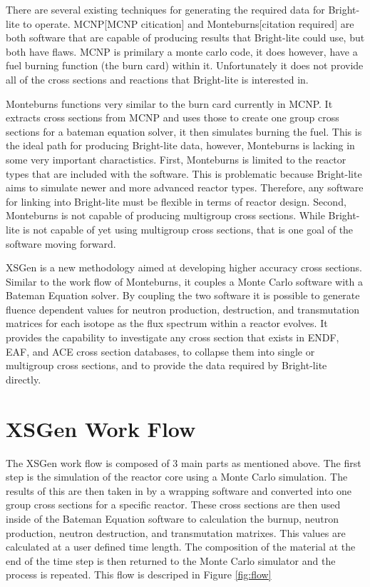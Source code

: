 \documentclass{article}
\begin{document}
There are several existing techniques for generating the required data for Bright-lite to operate. MCNP[MCNP citication] and Monteburns[citation required] are both software that are capable of producing results that Bright-lite could use, but both have flaws. MCNP is primilary a monte carlo code, it does however, have a fuel burning function (the burn card) within it. Unfortunately it does not provide all of the cross sections and reactions that Bright-lite is interested in. 

Monteburns functions very similar to the burn card currently in MCNP. It extracts cross sections from MCNP and uses those to create one group cross sections for a bateman equation solver, it then simulates burning the fuel. This is the ideal path for producing Bright-lite data, however, Monteburns is lacking in some very important charactistics. First, Monteburns is limited to the reactor types that are included with the software. This is problematic because Bright-lite aims to simulate newer and more advanced reactor types. Therefore, any software for linking into Bright-lite must be flexible in terms of reactor design. Second, Monteburns is not capable of producing multigroup cross sections. While Bright-lite is not capable of yet using multigroup cross sections, that is one goal of the software moving forward.   

XSGen is a new methodology aimed at developing higher accuracy cross sections. Similar to the work flow of Monteburns, it couples a Monte Carlo software with a Bateman Equation solver.  By coupling the two software it is possible to generate fluence dependent values for neutron production, destruction, and transmutation matrices for each isotope as the flux spectrum within a reactor evolves. It provides the capability to investigate any cross section that exists in ENDF, EAF, and ACE cross section databases, to collapse them into single or multigroup cross sections, and to provide the data required by Bright-lite directly. 

\section{XSGen Work Flow}
The XSGen work flow is composed of 3 main parts as mentioned above. The first step is the simulation of the reactor core using a Monte Carlo simulation. The results of this are then taken in by a wrapping software and converted into one group cross sections for a specific reactor. These cross sections are then used inside of the Bateman Equation software to calculation the burnup, neutron production, neutron destruction, and transmutation matrixes. This values are calculated at a user defined time length. The composition of the material at the end of the time step is then returned to the Monte Carlo simulator and the process is repeated. This flow is descriped in Figure \ref{fig:flow}
\end{document}
